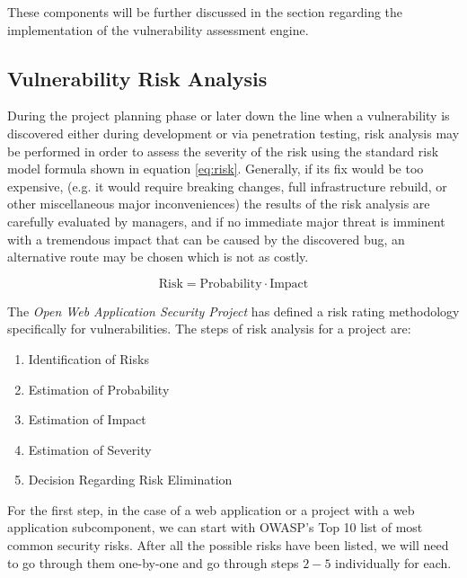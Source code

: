 \documentclass[a4paper,12pt]{article}
\begin{document}
	These components will be further discussed in the section regarding the implementation of the vulnerability assessment engine.
	
\subsection{Vulnerability Risk Analysis} \label{vulnriskanal}
 

	During the project planning phase or later down the line when a vulnerability is discovered either during development or via penetration testing, risk analysis may be performed in order to assess the severity of the risk using the standard risk model formula shown in equation \ref{eq:risk}. Generally, if its fix would be too expensive, (e.g. it would require breaking changes, full infrastructure rebuild, or other miscellaneous major inconveniences) the results of the risk analysis are carefully evaluated by managers, and if no immediate major threat is imminent with a tremendous impact that can be caused by the discovered bug, an alternative route may be chosen which is not as costly.
	
	\begin{equation} \label{eq:risk}
		\textrm{Risk} = \textrm{Probability} \cdot \textrm{Impact}
	\end{equation}
	
	The \textit{Open Web Application Security Project} has defined a risk rating methodology\cite{owasp4} specifically for vulnerabilities. The steps of risk analysis for a project are:
	
	\begin{enumerate}
		\item Identification of Risks
		\item Estimation of Probability
		\item Estimation of Impact
		\item Estimation of Severity
		\item Decision Regarding Risk Elimination
	\end{enumerate}
	
	For the first step, in the case of a web application or a project with a web application subcomponent, we can start with OWASP's Top 10\cite{owasp10} list of most common security risks. After all the possible risks have been listed, we will need to go through them one-by-one and go through steps $2-5$ individually for each.
	
\end{document}
